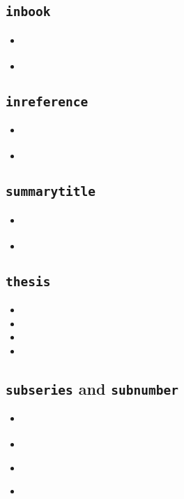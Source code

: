 \documentclass[a4paper,12pt]{scrartcl}
\newcommand{\Typ}[1]{\texttt{\symbol{64}#1}}
\newcommand{\Feld}[1]{\texttt{#1}}
\begin{document}
\subsection{\Typ{inbook}}
\begin{itemize}
    \item\cites{boppert:1998}%
    \item{}%
\end{itemize}


\subsection{\Typ{inreference}}
\begin{itemize}
    \item\cite{bauchhenss:et:al:1978}%
    \item{}%
\end{itemize}

\subsection{\Feld{summarytitle}}
\begin{itemize}
    \item\cite{ilinskaja:1965}%
    \item{}%
\end{itemize}

\subsection{\Typ{thesis}}
\begin{itemize}
    \item{}%
    \item{}%
    \item{}%
    \item{}%
\end{itemize}

\subsection{\Feld{subseries} and \Feld{subnumber}}
\begin{itemize}
    \item\cite{kossack:et:al:1980}%
    \item{}%
    \item\cite{harck:1980}%
    \item{}%
\end{itemize}
\end{document}
